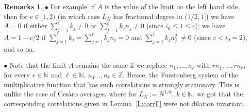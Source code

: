 \documentclass[11pt]{amsart}
\theoremstyle{definition}
\newtheorem*{remarks}{Remarks}
\newcommand{\N}{{\mathbb N}}
\newcommand{\Z}{{\mathbb Z}}
\begin{document}
  \begin{remarks}
  	  	$\bullet$ 	
  For example, if  $A$ is the value of the limit on the left hand side, then for  $c\in [1,2)$  (in which case $L_N$ has fractional degree in $(1/2,1]$) we have  $A=0$ if   either $\sum_{j=1}^\ell k_j\neq 0$ or  $\sum_{j=1}^\ell k_jn_j\neq 0$ (since $i_0\leq 1\leq c$); we have   $A=1-c/2$ if
  	 $\sum_{j=1}^\ell k_j= \sum_{j=1}^\ell k_jn_j=0$ and $\sum_{j=1}^\ell k_j n_j^2\ \neq 0$  (since $c<i_0=2$), and so on.
  	
  	
  	
  	$\bullet$ Note that the limit $A$ remains the same if we replace $n_1,\ldots, n_\ell$ with
  	$rn_1,\ldots, rn_\ell$,  for every $r\in\N$ and $\ell\in\N$, $n_1\ldots, n_\ell\in\Z$. Hence,  the Furstenberg system
  	of the multiplicative function that has such correlations is strongly stationary. This is unlike the case of Ces\`aro averages, where  for $L_N:=N^{1/k}$, $k\in\N$, we  got that the corresponding correlations given in Lemma~\ref{L:corrF} were not dilation invariant.
  \end{remarks}
\end{document}
